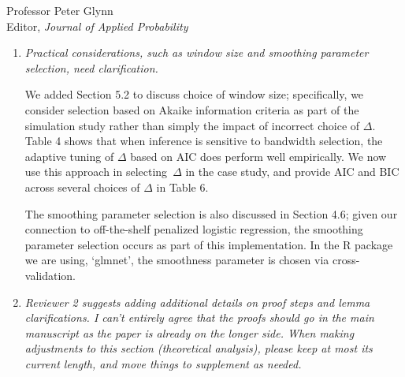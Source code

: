 \documentclass[11pt]{letter} %
\begin{document}
\begin{letter}{Professor
	Peter Glynn\\
	Editor, {\em Journal of Applied Probability}}
\begin{enumerate}
\vspace{5mm}
We have decided that the point we were trying to raise is not essential to the main manuscript, so we have moved the discussion of \emph{independent evolution} and its implication that $\varepsilon (t) = 0$ for all $t >0$ to Appendix B.  The key issue we were trying to clarify is that the traditional joint model formulation in which the observed health process and time-to-event are conditionally independent given the latent process implies that the hazard function conditional on the entire observed health process depends on values after the current time.  In the case study, for example, this implies that the expected risk of a button press given the entire sensor process will depend on future activity index and electrodermal activity.  This holds unless we assume the measurement error is set to zero.  While we still think it is an important point that should be more well appreciated in the joint modeling literature, the current paper has enough content for this discussion to be left to the appendix.  Moreover, the empirical impact seems to be limited and therefore it is better to make this point in less central to the current manuscript.
\vspace{5mm}

\item {\it Practical considerations, such as window size and smoothing parameter selection, need clarification.}

\vspace{5mm}
We added Section 5.2 to discuss choice of window size; specifically, we consider selection based on Akaike information criteria as part of the simulation study rather than simply the impact of incorrect choice of $\Delta$. Table 4 shows that when inference is sensitive to bandwidth selection, the adaptive tuning of $\Delta$ based on AIC does perform well empirically.  We now use this approach in selecting~$\Delta$ in the case study, and provide AIC and BIC across several choices of $\Delta$ in Table 6.
\vspace{5mm}

The smoothing parameter selection is also discussed in Section 4.6; given our connection to off-the-shelf penalized logistic regression, the smoothing parameter selection occurs as part of this implementation.  In the R package we are using, `glmnet', the smoothness parameter is chosen via cross-validation.
\vspace{5mm}

\item {\it Reviewer 2 suggests adding additional details on proof steps and lemma clarifications. I can't entirely agree that the proofs should go in the main manuscript as the paper is already on the longer side. When making adjustments to this section (theoretical analysis), please keep at most its current length, and move things to supplement as needed.}


\end{enumerate}
\end{letter}
\end{document}
